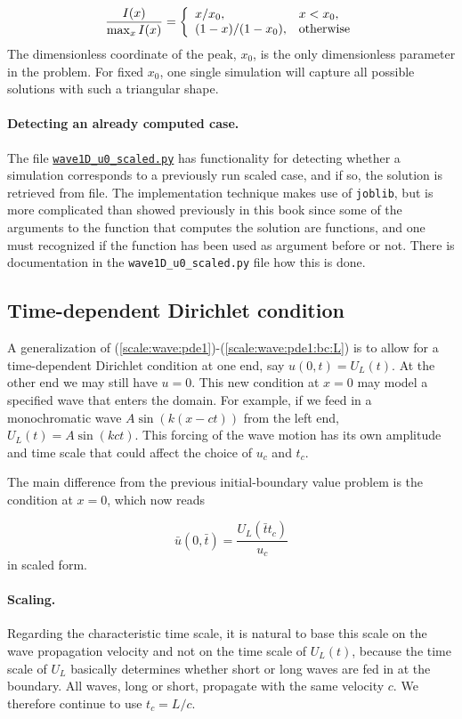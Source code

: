 \documentclass[graybox,envcountchap,sectrefs,final]{svmonodo}
\begin{document}
\[
\frac{I(x)}{\max_x I(x)} = \left\lbrace
\begin{array}{ll}
x/x_0, & x < x_0,\\ 
(1-x)/(1-x_0), & \hbox{otherwise}
\end{array}\right.
\]
The dimensionless coordinate of the peak, $x_0$, is the only
dimensionless parameter in the problem. For fixed $x_0$,
one single simulation will capture all possible solutions with such
a triangular shape.


\paragraph{Detecting an already computed case.}
The file \href{{http://tinyurl.com/o8pb3yy/wave1D_u0_scaled.py}}{\nolinkurl{wave1D_u0_scaled.py}}
has functionality for detecting whether a simulation corresponds to
a previously run scaled case, and if so, the solution is retrieved from
file. The implementation technique makes use of \texttt{joblib}, but is more
complicated than showed previously in this book since some of the
arguments to the function that computes the solution are functions,
and one must recognized if the function has been used as argument
before or not. There is documentation in the \Verb!wave1D_u0_scaled.py!
file how this is done.


\subsection{Time-dependent Dirichlet condition}
\label{scale:wave:pde2}

A generalization of (\ref{scale:wave:pde1})-(\ref{scale:wave:pde1:bc:L})
is to allow for a time-dependent Dirichlet condition at one end, say
$u(0,t)=U_L(t)$. At the other end we may still have $u=0$.  This new
condition at $x=0$ may model a specified wave that enters the
domain. For example, if we feed in a monochromatic wave
$A\sin(k(x-ct))$ from the left end, $U_L(t)=A\sin (kct)$.  This
forcing of the wave motion has its own amplitude and time scale that
could affect the choice of $u_c$ and $t_c$.

The main difference from the previous initial-boundary value problem
is the condition at $x=0$, which now reads

\[ \bar u(0,\bar t) = \frac{U_L(\bar t t_c)}{u_c}\]
in scaled form.

\paragraph{Scaling.}
Regarding the characteristic time scale, it is natural to base this scale on
the wave propagation velocity and not on the time scale of $U_L(t)$, because
the time scale of $U_L$ basically determines whether
short or long waves are fed in at the boundary. All waves, long or short,
propagate with the same velocity $c$. We therefore continue
to use $t_c=L/c$.
\end{document}
